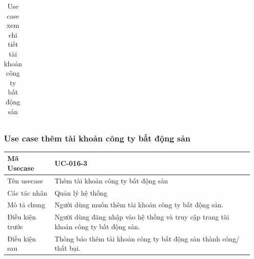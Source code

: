 \documentclass[12pt,a4paper]{article}
\begin{document}
\begin{table}[H]
\begin{tabular}{|p{3.5cm}|p{11.5cm}|c|}
            \\    \hline
        \end{tabular}
        \caption{Use case xem chi tiết tài khoản công ty bất động sản }
    \end{table}


    \subsubsection*{Use case thêm tài khoản công ty bất động sản}
    \begin{table}[H]
        \centering
        \begin{tabular}{|p{3.5cm}|p{11.5cm}|c|}
            \hline
            Mã Usecase      & UC-016-3                                                                            \\
            \hline
            Tên usecase     & Thêm tài khoản công ty bất động sản                                                 \\
            \hline
            Các tác nhân    & Quản lý hệ thống                                                                    \\
            \hline
            Mô tả chung     & Người dùng muốn thêm tài khoản công ty bất động sản.                                \\
            \hline

            Điều kiện trước & Người dùng đăng nhập vào hệ thống và truy cập trang tài khoản công ty bất động sản. \\
            \hline

            Điều kiện sau   & Thông báo thêm tài khoản công ty bất động sản thành công/ thất bại.                 \\
            \hline


\end{tabular}
\end{table}
\end{document}
